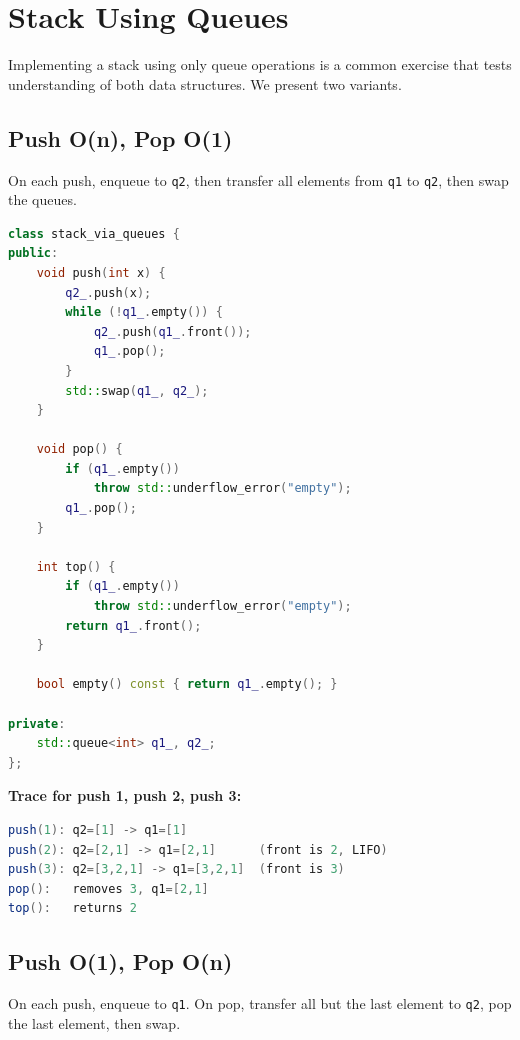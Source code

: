 \section{Stack Using Queues}

Implementing a stack using only queue operations is a common exercise that tests understanding of both data structures. We present two variants.

\subsection{Push O(n), Pop O(1)}

On each push, enqueue to \texttt{q2}, then transfer all elements from \texttt{q1} to \texttt{q2}, then swap the queues.

\begin{lstlisting}[language=C++]
class stack_via_queues {
public:
    void push(int x) {
        q2_.push(x);
        while (!q1_.empty()) {
            q2_.push(q1_.front());
            q1_.pop();
        }
        std::swap(q1_, q2_);
    }

    void pop() {
        if (q1_.empty())
            throw std::underflow_error("empty");
        q1_.pop();
    }

    int top() {
        if (q1_.empty())
            throw std::underflow_error("empty");
        return q1_.front();
    }

    bool empty() const { return q1_.empty(); }

private:
    std::queue<int> q1_, q2_;
};
\end{lstlisting}

\textbf{Trace for push 1, push 2, push 3:}

\begin{lstlisting}[language=Java]
push(1): q2=[1] -> q1=[1]
push(2): q2=[2,1] -> q1=[2,1]      (front is 2, LIFO)
push(3): q2=[3,2,1] -> q1=[3,2,1]  (front is 3)
pop():   removes 3, q1=[2,1]
top():   returns 2
\end{lstlisting}

\subsection{Push O(1), Pop O(n)}

On each push, enqueue to \texttt{q1}. On pop, transfer all but the last element to \texttt{q2}, pop the last element, then swap.

